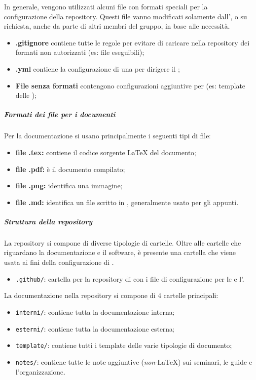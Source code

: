 		In generale, vengono utilizzati alcuni file con formati speciali per la configurazione della repository. Questi file vanno modificati solamente dall', o su richiesta, anche da parte di altri membri del gruppo, in base alle necessità.
		\begin{itemize}
			\item \textbf{.gitignore} contiene tutte le regole per evitare di caricare nella repository dei formati non autorizzati (es: file eseguibili);
			\item \textbf{.yml} contiene la configurazione di una  per dirigere il ;
			\item \textbf{File senza formati} contengono configurazioni aggiuntive per  (es: template delle );
		\end{itemize}

		\subparagraph{Formati dei file per i documenti}

		Per la documentazione si usano principalmente i seguenti tipi di file:
		\begin{itemize}
			\item \textbf{file .tex:} contiene il codice sorgente \LaTeX{} del documento;
			\item \textbf{file .pdf:} è il documento compilato;
			\item \textbf{file .png:} identifica una immagine;
			\item \textbf{file .md:} identifica un file scritto in , generalmente usato per gli appunti.
		\end{itemize}

		\subparagraph{Struttura della repository}


		La repository si compone di diverse tipologie di cartelle. Oltre alle cartelle che riguardano la documentazione e il software, è presente una cartella che viene usata ai fini della configurazione di .
		\begin{itemize}
			\item \verb!.github/!: cartella per la repository di  con i file di configurazione per le  e l'.
		\end{itemize}

		La documentazione nella repository si compone di 4 cartelle principali:
		\begin{itemize}
			\item \verb!interni/!: contiene tutta la documentazione interna;
			\item \verb!esterni/!: contiene tutta la documentazione esterna;
			\item \verb!template/!: contiene tutti i template delle varie tipologie di documento;
			\item \verb!notes/!: contiene tutte le note aggiuntive (\textit{non}-\LaTeX{}) sui seminari, le guide e l'organizzazione.
		\end{itemize}


